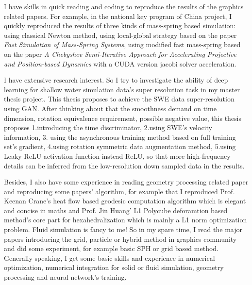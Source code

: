 \documentclass[a4paper,12pt]{article}
\begin{document}
I have skills in quick reading and coding to reproduce the results of the graphics related papers. For example, in the national key program of China project, I quickly reproduced the results of three kinds of mass-spring based simulation: using classical Newton method, using local-global strategy based on the paper \textit{Fast Simulation of Mass-Spring Systems}, using modified fast mass-spring based on the paper \textit{A Chebyshev Semi-Iterative Approach for Accelerating Projective and Position-based Dynamics} with a CUDA version jacobi solver acceleration.\vspace{1.2ex} %

I have extensive research interest. So I try to investigate the ability of deep learning for shallow water simulation data's super resolution task in my master thesis project. This thesis proposes to achieve the SWE data super-resolution using GAN. After thinking about that the smoothness demand on time dimension, rotation equivalence requirement, possible negative value, this thesis proposes 1.introducing the time discriminator, 2.using SWE's velocity information, 3. using the asynchronous training method based on full training set's gradient, 4.using rotation symmetric data augmentation method, 5.using Leaky ReLU activation function instead ReLU, so that more high-frequency details can be inferred from the low-resolution down sampled data in the results.\vspace{1.2ex}  %

Besides, I also have some experience in reading geometry processing related paper and reproducing some papers' algorithm, for example that I reproduced Prof. Keenan Crane's heat flow based geodesic computation algorithm which is elegant and concise in maths and Prof. Jin Huang' L1 Polycube deforamtion based method's core part for hexahedralization which is mainly a L1 norm optimization problem. Fluid simulation is fancy to me! So in my spare time, I read the major papers introducing the grid, particle or hybrid method in graphics community and did some experiment, for example basic SPH or grid based method. Generally speaking, I get some basic skills and experience in numerical optimization, numerical integration for solid or fluid simulation, geometry processing and neural network's training.\vspace{1.2ex}
\end{document}

